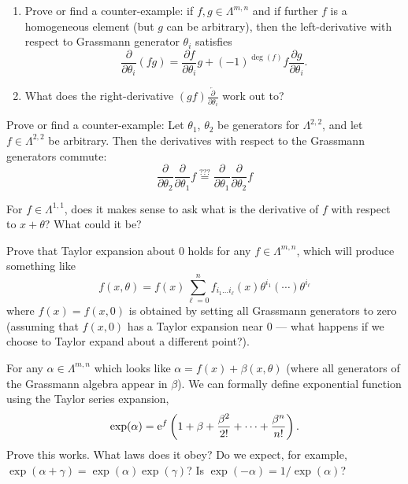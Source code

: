 \begin{exercise}
  \begin{enumerate}
  \item  Prove or find a counter-example: if $f,g\in\Lambda^{m,n}$ and if
  further $f$ is a homogeneous element (but $g$ can be arbitrary), then
  the left-derivative with respect to Grassmann generator $\theta_{i}$ satisfies
  \begin{equation}
\frac{\partial}{\partial\theta_{i}}(fg) = \frac{\partial f}{\partial\theta_{i}}g+(-1)^{\deg(f)}f\frac{\partial g}{\partial\theta_{i}}.
  \end{equation}
\item What does the right-derivative $(gf)\frac{\overleftarrow{\partial}}{\partial\theta_{i}}$
  work out to?
  \end{enumerate}
\end{exercise}

\begin{exercise}
Prove or find a counter-example: Let $\theta_{1}$, $\theta_{2}$ be
generators for $\Lambda^{2,2}$, and let $f\in\Lambda^{2,2}$ be
arbitrary. Then the derivatives with respect to the Grassmann generators commute:
\begin{equation}
\frac{\partial}{\partial\theta_{2}}\frac{\partial}{\partial\theta_{1}}f
\stackrel{???}{=}\frac{\partial}{\partial\theta_{1}}\frac{\partial}{\partial\theta_{2}}f
\end{equation}
\end{exercise}


\begin{puzzle}
For $f\in\Lambda^{1,1}$, does it makes sense to ask what is the
derivative of $f$ with respect to $x+\theta$? What could it be?
\end{puzzle}

\begin{exercise}
Prove that Taylor expansion about 0 holds for any $f\in\Lambda^{m,n}$, which
will produce something like
\begin{equation}
f(x,\theta) = f(x)\sum^{n}_{\ell=0}f_{i_{1}\dots i_{\ell}}(x)\theta^{i_{1}}(\cdots)\theta^{i_{\ell}}
\end{equation}
where $f(x)=f(x,0)$ is obtained by setting all Grassmann generators to
zero (assuming that $f(x,0)$ has a Taylor expansion near $0$ --- what
happens if we choose to Taylor expand about a different point?).
\end{exercise}


\begin{exercise}\label{xca:differentiation:taylor-series-for-exp}
For any $\alpha\in\Lambda^{m,n}$ which looks like
$\alpha=f(x)+\beta(x,\theta)$ (where all generators of the
Grassmann algebra appear in $\beta$). We can formally define exponential
function using the Taylor series expansion,
\begin{equation}
\exp(\alpha) = \mathrm{e}^{f}\left(1 + \beta + \frac{\beta^{2}}{2!} + \dots + \frac{\beta^{n}}{n!}\right).
\end{equation}
Prove this works. What laws does it obey? Do we expect, for example, $\exp(\alpha+\gamma)=\exp(\alpha)\exp(\gamma)$?
Is $\exp(-\alpha)=1/\exp(\alpha)$?
\end{exercise}


